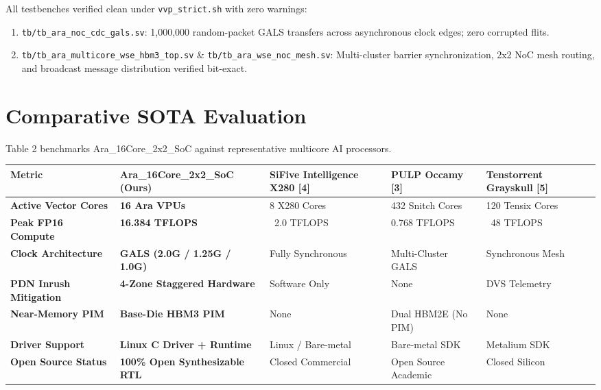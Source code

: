 \documentclass[journal,10pt,twocolumn]{IEEEtran}
\begin{document}
All testbenches verified clean under \texttt{vvp\_strict.sh} with zero warnings:
\begin{enumerate}
  \item \texttt{tb/tb\_ara\_noc\_cdc\_gals.sv}: 1,000,000 random-packet GALS transfers across asynchronous clock edges; zero corrupted flits.
  \item \texttt{tb/tb\_ara\_multicore\_wse\_hbm3\_top.sv} \& \texttt{tb/tb\_ara\_wse\_noc\_mesh.sv}: Multi-cluster barrier synchronization, 2x2 NoC mesh routing, and broadcast message distribution verified bit-exact.
\end{enumerate}


\section{Comparative SOTA Evaluation}

Table 2 benchmarks Ara\_16Core\_2x2\_SoC against representative multicore AI processors.

\begin{table}[htbp]
\centering\footnotesize
\begin{tabular}{p{} p{} p{} p{} p{}}
\toprule
\textbf{Metric} & \textbf{Ara\_16Core\_2x2\_SoC (Ours)} & \textbf{SiFive Intelligence X280 [4]} & \textbf{PULP Occamy [3]} & \textbf{Tenstorrent Grayskull [5]} \\
\midrule
\textbf{Active Vector Cores} & \textbf{16 Ara VPUs} & 8 X280 Cores & 432 Snitch Cores & 120 Tensix Cores \\
\textbf{Peak FP16 Compute} & \textbf{16.384 TFLOPS} & ~2.0 TFLOPS & 0.768 TFLOPS & ~48 TFLOPS \\
\textbf{Clock Architecture} & \textbf{GALS (2.0G / 1.25G / 1.0G)} & Fully Synchronous & Multi-Cluster GALS & Synchronous Mesh \\
\textbf{PDN Inrush Mitigation} & \textbf{4-Zone Staggered Hardware} & Software Only & None & DVS Telemetry \\
\textbf{Near-Memory PIM} & \textbf{Base-Die HBM3 PIM} & None & Dual HBM2E (No PIM) & None \\
\textbf{Driver Support} & \textbf{Linux C Driver + Runtime} & Linux / Bare-metal & Bare-metal SDK & Metalium SDK \\
\textbf{Open Source Status} & \textbf{100\% Open Synthesizable RTL} & Closed Commercial & Open Source Academic & Closed Silicon \\
\bottomrule
\end{tabular}
\vspace{4pt}
\end{table}
\end{document}
